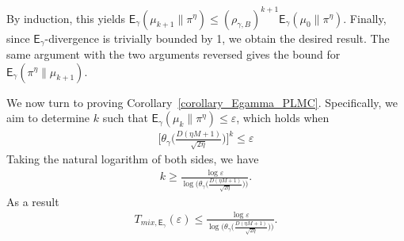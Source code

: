 \documentclass[10pt, journal]{IEEEtran}
\newcommand{\egamma}{$\mathsf{E}_\gamma$}
\begin{document}
By induction, this yields $\mathsf{E}_\gamma(\mu_{k+1} \| \pi^\eta) \le (\rho_{\gamma,B})^{k+1} \mathsf{E}_\gamma(\mu_0 \| \pi^\eta)$. Finally, since \egamma-divergence is trivially bounded by 1, we obtain the desired result.
The same argument with the two arguments reversed gives the bound for $\mathsf E_\gamma(\pi^\eta\|\mu_{k+1})$.

We now turn to proving Corollary~\ref{corollary_Egamma_PLMC}. Specifically, we aim to determine $k$ such that $\mathsf{E}_\gamma(\mu_{k} \| \pi^\eta) \le \varepsilon$, which holds when
\begin{align}
    \Bigg[\theta_{\gamma}\Big(\frac{D(\eta M + 1)}{\sqrt{2\eta}}\Big)\Bigg]^k \le \varepsilon \nonumber
\end{align}
Taking the natural logarithm of both sides, we have
\begin{align}
    k \ge \frac{\log \varepsilon}{\log\bigg(\theta_{\gamma}\Big(\frac{D(\eta M + 1)}{\sqrt{2\eta}}\Big)\bigg)}\nonumber.
\end{align}
As a result
\begin{align}
    T_{mix,\mathsf{E}_\gamma}(\varepsilon) \le \frac{\log \varepsilon}{\log\bigg(\theta_{\gamma}\Big(\frac{D(\eta M + 1)}{\sqrt{2\eta}}\Big)\bigg)} \nonumber.
\end{align}
\end{document}
